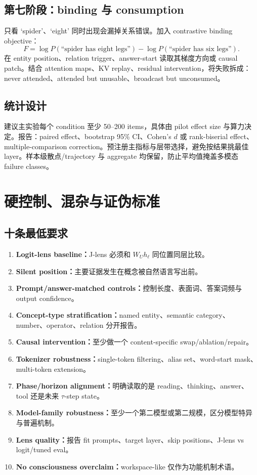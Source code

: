 \documentclass[10.5pt,a4paper]{ctexart}
\begin{document}
\subsection{第七阶段：binding 与 consumption}
只看 `spider'、`eight' 同时出现会漏掉关系错误。加入 contrastive binding objective：
\[
F
=
\log P(\text{``spider has eight legs''})
-
\log P(\text{``spider has six legs''}).
\]
在 entity position、relation trigger、answer-start 读取其梯度方向或 causal patch。结合 attention maps、KV replay、residual intervention，将失败拆成：never attended、attended but unusable、broadcast but unconsumed。

\subsection{统计设计}
建议主实验每个 condition 至少 50--200 items，具体由 pilot effect size 与算力决定。报告：paired effect、bootstrap 95\% CI、Cohen's $d$ 或 rank-biserial effect、multiple-comparison correction。预注册主指标与层带选择，避免按结果挑最佳 layer。样本级散点/trajectory 与 aggregate 均保留，防止平均值掩盖多模态 failure classes。

\section{硬控制、混杂与证伪标准}

\subsection{十条最低要求}
\begin{enumerate}
  \item \textbf{Logit-lens baseline：}J-lens 必须和 \(W_U h_\ell\) 同位置同层比较。
  \item \textbf{Silent position：}主要证据发生在概念被自然语言写出前。
  \item \textbf{Prompt/answer-matched controls：}控制长度、表面词、答案词频与 output confidence。
  \item \textbf{Concept-type stratification：}named entity、semantic category、number、operator、relation 分开报告。
  \item \textbf{Causal intervention：}至少做一个 content-specific swap/ablation/repair。
  \item \textbf{Tokenizer robustness：}single-token filtering、alias set、word-start mask、multi-token extension。
  \item \textbf{Phase/horizon alignment：}明确读取的是 reading、thinking、answer、tool 还是未来 \(\tau\)-step state。
  \item \textbf{Model-family robustness：}至少一个第二模型或第二规模，区分模型特异与普遍机制。
  \item \textbf{Lens quality：}报告 fit prompts、target layer、skip positions、J-lens vs logit/tuned eval。
  \item \textbf{No consciousness overclaim：}workspace-like 仅作为功能机制术语。
\end{enumerate}
\end{document}
